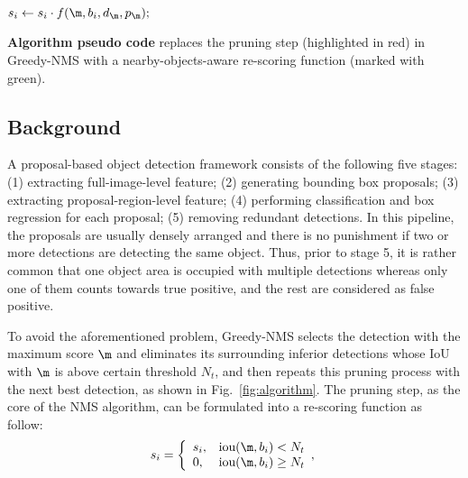 \documentclass[sigconf]{acmart}
\begin{document}
\begin{algorithm}
{{{{                    \begin{tcolorbox}[
                        standard jigsaw,
                        opacityback=0,
                        colframe=mygreen,
                        text width=150pt,
                        boxsep=3pt,
                        left=0pt,right=0pt,top=0pt,bottom=0pt,
                    ]
                    \textcolor{mygreen}{
                    $
                        s_i \leftarrow s_i \cdot f(\m, b_i, d_\m, p_\m);
                    $}
                    \begin{flushright}
                        \nmsname{}
                    \end{flushright}
                    \end{tcolorbox}
                }
            }
        }
    }
    \caption{\textbf{Algorithm pseudo code} {\normalfont \nmsname{} replaces the pruning step (highlighted in red) in Greedy-NMS with a nearby-objects-aware re-scoring function (marked with green).}}
    \label{fig:algorithm}
\end{algorithm} 
\subsection{Background} 
\label{sec:background}
A proposal-based object detection framework consists of the following five stages: (1) extracting full-image-level feature; (2) generating bounding box proposals; (3) extracting proposal-region-level feature; (4) performing classification and box regression for each proposal; (5) removing redundant detections. In this pipeline, the proposals are usually densely arranged and there is no punishment if two or more detections are detecting the same object. Thus, prior to stage 5, it is rather common that one object area is occupied with multiple detections whereas only one of them counts towards true positive, and the rest are considered as false positive. 

To avoid the aforementioned problem, Greedy-NMS selects the detection with the maximum score $\m$ and eliminates its surrounding inferior detections whose IoU with $\m$ is above certain threshold $N_t$, and then repeats this pruning process with the next best detection, as shown in Fig.~\ref{fig:algorithm}. The pruning step, as the core of the NMS algorithm, can be formulated into a re-scoring function as follow:
\begin{equation}
    s_i=\left\{
        \begin{array}{ll}
            s_i,
            &\text{iou}(\m, b_i) < N_t 
            \\
            0,
            &\text{iou}(\m, b_i) \geq N_t
        \end{array}
        ,
        \right.
    \label{eq:greedy-nms}
\end{equation} 
\end{document}
